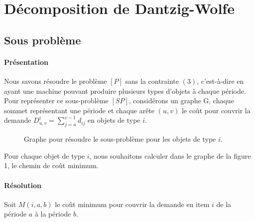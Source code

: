 \documentclass[12pt,a4paper]{article}
\begin{document}
 	\newpage
 	
	\section*{Décomposition de Dantzig-Wolfe}
	\subsection*{Sous problème}
	\paragraph{Présentation} Nous savons résoudre le problème $[P]$ sans la contrainte $(3)$, c'est-à-dire en ayant une machine pouvant produire plusieurs types d'objets à chaque période. Pour représenter ce sous-problème $[SP]$, considérons un graphe G, chaque sommet représentant une période et chaque arête $(u,v)$ le coût pour couvrir la demande $D^i_{u,v} = \sum_{j=u}^{v-1} d_{ij}$ en objets de type $i$. \medbreak
	
	\begin{figure}[h!]
		\centering
	\caption{Graphe pour résoudre le sous-problème pour les objets de type $i$.}
	\end{figure}
	
	 Pour chaque objet de type $i$, nous souhaitons calculer dans le graphe de la figure 1, le chemin de coût minimum.
	 
	 \paragraph{Résolution} Soit $M(i,a,b)$ le coût minimum pour couvrir la demande en item $i$ de la période $a$ à la période $b$.
	 
\end{document}
